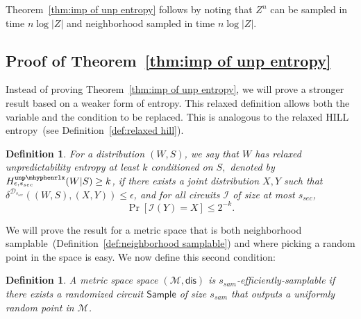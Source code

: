 \documentclass[11pt]{article}
\newcommand{\thref}[1]{\mbox{Theorem~\ref{#1}}}
\newcommand{\defref}[1]{\mbox{Definition~\ref{#1}}}
\newcommand{\class}[1]{{\ensuremath{\mathsf{#1}}}}
\newcommand{\sample}{\ensuremath{\class{Sample}}\xspace}
\newcommand{\dis}{\ensuremath{\mathsf{dis}}}
\newcommand{\unprlx}{\ensuremath{\mathtt{unp\mhyphen rlx}}\xspace}
\newtheorem{definition}[theorem]{Definition}
\begin{document}
\thref{thm:imp of unp entropy} follows by noting that $Z^n$ can be sampled in time $n\log |Z|$ and neighborhood sampled in time $n\log |Z|$.
\subsection{Proof of \thref{thm:imp of unp entropy}}
\label{sec:proof of imp unp entropy}
Instead of proving \thref{thm:imp of unp entropy}, we will prove a stronger result based on a weaker form of entropy.  This relaxed definition allows both the variable and the condition to be replaced.  This is analogous to the relaxed HILL entropy~(see \defref{def:relaxed hill}).%

\begin{definition}
\label{def:relaxed unp entropy}
For a distribution $(W, S)$, we say that $W$ has \emph{relaxed unpredictability entropy} at least $k$ conditioned on $S,$ denoted by $H^{\unprlx}_{\epsilon, s_{sec}} (W|S) \geq k$, if there exists a joint distribution $X, Y$ such that $\delta^{\mathcal{D}_{s_{sec}}}((W, S),(X, Y))\leq \epsilon$, and for all circuits $\mathcal{I}$ of size at most $s_{sec}$,
\[
\Pr[\mathcal{I}(Y) = X ] \leq 2^{-k}
.\]
\end{definition}

We will prove the result for a metric space that is both neighborhood samplable~(\defref{def:neighborhood samplable}) and where picking a random point in the space is easy.  We now define this second condition:
\begin{definition}
A metric space space $(\mathcal{M}, \dis)$ is $s_{sam}$-\emph{efficiently-samplable} if there exists a randomized circuit $\sample$ of size $s_{sam}$ that outputs a uniformly random point in $\mathcal{M}$.
\end{definition}
\end{document}
